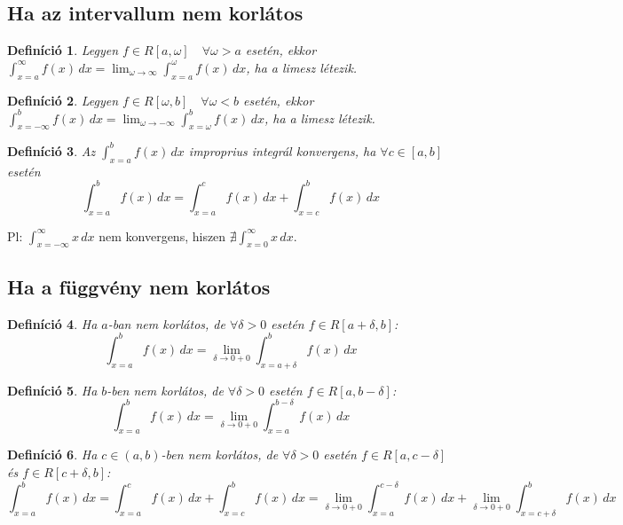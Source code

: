\documentclass[a4paper,12pt,twoside]{book}
\newtheorem{defi}{Definíció}[chapter]
\theoremstyle{break}
\theoremstyle{plain}
\newcommand{\hatInteg}[3]{\ensuremath{\int^{#2}_{x=#1} #3\, dx}}
\begin{document}
\subsection{Ha az intervallum nem korlátos}

\begin{defi} Legyen $f\in R[a,\omega] \quad \forall \omega > a$ esetén, ekkor $\displaystyle \hatInteg{a}{\infty}{f(x)}=\lim_{\omega\to\infty} \hatInteg{a}{\omega}{f(x)}$, ha a limesz létezik.\end{defi}

\begin{defi} Legyen $f\in R[\omega, b] \quad \forall \omega < b$ esetén, ekkor $\displaystyle \hatInteg{-\infty}{b}{f(x)}=\lim_{\omega\to-\infty} \hatInteg{\omega}{b}{f(x)}$, ha a limesz létezik.\end{defi}

\begin{defi} Az $\displaystyle \hatInteg{a}{b}{f(x)}$ improprius integrál konvergens, ha $\forall c\in[a,b]$ esetén
 \[\hatInteg{a}{b}{f(x)} = \hatInteg{a}{c}{f(x)}+\hatInteg{c}{b}{f(x)}\]
\end{defi}

Pl: $\displaystyle \hatInteg{-\infty}{\infty}{x}$ nem konvergens, hiszen $\nexists \hatInteg{0}{\infty}{x}$.

\subsection{Ha a függvény nem korlátos}

\begin{defi}
 Ha $a$-ban nem korlátos, de $\forall\delta>0$ esetén $f\in R[a+\delta, b]$:
  \[\hatInteg{a}{b}{f(x)} = \lim_{\delta\to 0+0} \hatInteg{a+\delta}{b}{f(x)}\]
\end{defi}

\begin{defi}
 Ha $b$-ben nem korlátos, de $\forall\delta>0$ esetén $f\in R[a, b-\delta]$:
  \[\hatInteg{a}{b}{f(x)} = \lim_{\delta\to 0+0} \hatInteg{a}{b-\delta}{f(x)}\]
\end{defi}

\begin{defi}
 Ha $c\in(a,b)$-ben nem korlátos, de $\forall\delta>0$ esetén $f\in R[a, c-\delta]$ és $f\in R[c+\delta, b]$:
  \[\hatInteg{a}{b}{f(x)} = \hatInteg{a}{c}{f(x)} + \hatInteg{c}{b}{f(x)} = \lim_{\delta\to 0+0} \hatInteg{a}{c-\delta}{f(x)} + \lim_{\delta\to 0+0} \hatInteg{c+\delta}{b}{f(x)}\]
\end{defi}
\end{document}
